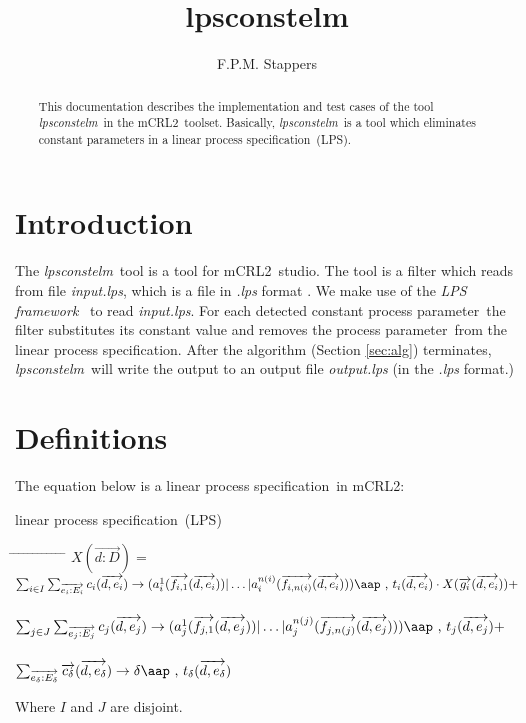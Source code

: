\index{}\documentclass[a4paper,10pt]{article}
\title{lpsconstelm}
\author{F.P.M. Stappers}
\theoremstyle{plain}
\theoremstyle{definition}
\newcommand{\lps}{linear process specification}
\newcommand{\tool}{\textit{lpsconstelm}}
\newcommand{\ovr}{\overrightarrow}
\newcommand{\mcrl}{mCRL2}
\newcommand{\framework}{\textit{LPS framework} \cite{LPSframework}}
\newcommand{\pp}{process parameter}
\newcommand{\ti}{\textit}
\newcommand{\tab}{\hspace*{5.mm} \= \hspace*{5.mm} \= \hspace*{5.mm} \= \hspace*{5.mm} \= \hspace*{5.mm} \= \hspace*{5.mm}  \= \hspace*{5.mm}  \= \hspace*{5.mm}  \= \hspace*{5.mm} \= \hspace*{5.mm} \= \hspace*{5.mm}  \= \hspace*{5.mm}  \= \hspace*{5.mm}\kill}
\newcommand{\at}[1]{\mbox{\aap ,} #1}
\begin{document}
\maketitle

\begin{abstract}
This documentation describes the implementation and test cases of the tool \tool\ in  the \mcrl\ toolset.
Basically, \tool\ is a tool which eliminates constant parameters in a \lps\ (LPS).
\end{abstract}

\tableofcontents

\section{Introduction}
The \tool\ tool is a tool for \mcrl\ studio. The tool is a
filter which reads from file \ti{input.lps}, which is
a file in \ti{.lps} format \cite{LPSformat}. We make use of the
\framework\ to read \ti{input.lps}. For
each detected constant \pp\ the filter substitutes its constant value and removes the \pp\ from the
\lps . After the algorithm (Section \ref{sec:alg}) terminates, \tool\
will write the output to an output file \ti{output.lps} (in the \ti{.lps} format.)

\section{Definitions} \label{sec:def}

The equation below is a \lps\ in \mcrl :
\begin{defn}\lps\ (LPS) \newline
\begin{tabbing}
\tab
$X (\ovr{d: D}) = $ \> \> \> $ \sum_{i \in I} \sum_{\ovr{e_i: E_i}} c_i ( \ovr{d, e_i }) \rightarrow
(a_i^1 (\ovr{f_{i,1}}(\ovr{d,e_i})) \vert \ldots \vert a_i^{n(i)}(\ovr{f_{i,n(i)}}(\ovr{d,e_i}))) \at \text{ } t_i(\ovr{d,e_i})  \cdot X(\ovr{g_i}(\ovr{d,e_i})) +$ \\ \\
\> \> \> $ \sum_{j \in J} \sum_{\ovr{e_j: E_j}} c_j ( \ovr{d, e_j} ) \rightarrow
(a_j^1 (\ovr{f_{j,1}}(\ovr{d,e_j})) \vert \ldots \vert a_j^{n(j)}(\ovr{f_{j,n(j)}}(\ovr{d,e_j}))) \at \text{ } t_j(\ovr{d,e_j}) + $ \\ \\
\> \> \> $\sum_{\ovr{e_\delta:E_\delta}} \ovr{c_\delta} ( \ovr{d, e_\delta}) \rightarrow
\delta \at \text{ } t_\delta(\ovr{d,e_\delta})$
\end{tabbing}

Where $I$ and $J$ are disjoint.\\
\end{defn}
\end{document}
